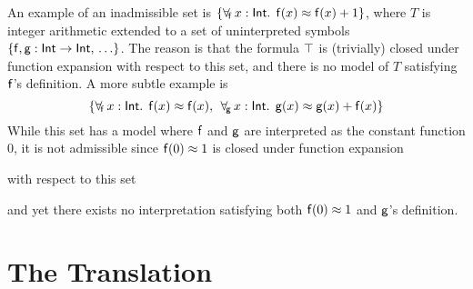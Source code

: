 An example of an inadmissible set is
$\{ \forall_{\!\mathsf{f}\:} x : \mathsf{Int}.\;\, \mathsf{f}( x ) \approx \mathsf{f}( x ) + 1 \}$,
where $T$ is integer arithmetic extended to a set of uninterpreted symbols
$\{\mathsf{f}, \mathsf{g} :\mathsf{Int} \rightarrow \mathsf{Int},\, \ldots \}$.
The reason is that the formula $\top$ is (trivially) closed under function expansion with respect to this set,
and there is no model of $T$
satisfying $\mathsf{f}$'s definition. A more subtle example is
\[\{\forall_{\!\mathsf{f}\:} x : \mathsf{Int}.\;\, \mathsf{f}( x ) \approx \mathsf{f}( x ),\allowbreak\;\, \forall_{\!\mathsf{g}\:} x : \mathsf{Int}.\;\, \mathsf{g}( x ) \approx \mathsf{g}( x ) + \nobreak\mathsf{f}( x )\}\]
While this set has a model where $\mathsf{f}$ and $\mathsf{g}$ are interpreted as the
constant function $0$, it is not admissible since %
$\mathsf{f}( 0 ) \approx 1$ is
closed under function expansion \begin{rep}with respect to this set\end{rep}
and yet there exists
no interpretation satisfying both $\mathsf{f}( 0 ) \approx 1$ and $\mathsf{g}$'s
definition.


\section{The Translation}
\label{sec:encoding}

\newcommand{\itemx}{\itemindent6.35em\item}

